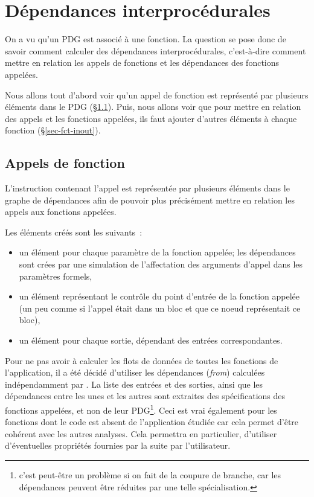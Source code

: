 \chapter{Dépendances interprocédurales}\label{sec-intro-call}

On a vu qu'un PDG est associé à une fonction.
La question se pose donc de savoir
comment calculer des dépendances interprocédurales, c'est-à-dire comment mettre
en relation les appels de fonctions et les dépendances des fonctions appelées.

Nous allons tout d'abord voir qu'un appel de fonction
est représenté par plusieurs éléments dans le PDG (\S\ref{sec-call}).
Puis, nous allons voir que pour mettre en relation des appels et les fonctions
appelées, ils faut ajouter d'autres éléments à chaque fonction
(\S\ref{sec-fct-inout}).

\section{Appels de fonction}\label{sec-call}

L'instruction contenant l'appel est représentée par plusieurs
éléments dans le graphe de dépendances
afin de pouvoir plus précisément mettre en relation les appels aux
fonctions appelées.

Les éléments créés sont les suivants~:
\begin{itemize}
\item un élément pour chaque paramètre de la fonction appelée;
  les dépendances sont crées par une simulation
  de l'affectation des arguments d'appel dans les paramètres formels,
\item un élément représentant le contrôle du point d'entrée de la fonction
  appelée (un peu comme si l'appel était dans un bloc et que ce noeud
  représentait ce bloc),
\item un élément pour chaque sortie, dépendant des entrées correspondantes.
\end{itemize}

Pour ne pas avoir à calculer les flots de données de toutes les fonctions de
l'application, il a été décidé d'utiliser les dépendances ({\it from})
calculées indépendamment par \ppc.
La liste des entrées et des sorties, ainsi que les dépendances entre les unes et
les autres sont extraites des spécifications des fonctions appelées, et non de
leur PDG\footnote{c'est peut-être un problème
si on fait de la coupure de branche, car les dépendances peuvent être réduites
par une telle spécialisation.}.
Ceci est vrai également pour les
fonctions dont le code est absent de l'application étudiée
car cela permet d'être cohérent avec les autres analyses.
Cela permettra en particulier, d'utiliser d'éventuelles propriétés
fournies par la suite par l'utilisateur.

